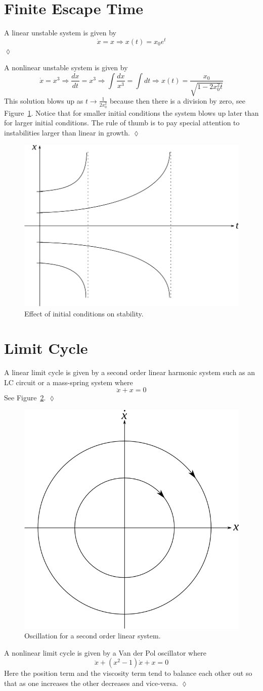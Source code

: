 \section{Finite Escape Time}
\label{sec:01fet}
\begin{example}
A linear unstable system is given by
$$\dot{x} = x \Rightarrow x(t) = x_0e^t$$
$\lozenge$
\end{example}

\begin{example}
A nonlinear unstable system is given by
$$\dot{x} = x^3 \Rightarrow \frac{dx}{dt}=x^3 \Rightarrow \int\frac{dx}{x^3} = \int dt \Rightarrow x(t) = \frac{x_0}{\sqrt{1-2x_0^2t}}$$
This solution blows up as $t\to\frac{1}{2x_0^2}$ because then there is a division by zero, see Figure~\ref{fig:01blowup}.
Notice that for smaller initial conditions the system blows up later than for larger initial conditions.
The rule of thumb is to pay special attention to instabilities larger than linear in growth.
$\lozenge$
\end{example}

\begin{figure}[ht!]
\centering
\includegraphics[width=.4\textwidth]{images/01blowup}
\caption{Effect of initial conditions on stability.}
\label{fig:01blowup}
\end{figure}

\section{Limit Cycle}
\begin{example}
A linear limit cycle is given by a second order linear harmonic system such as an LC circuit or a mass-spring system where
$$\ddot{x} + x = 0$$
See Figure~\ref{fig:01secondorder}.
$\lozenge$
\end{example}

\begin{figure}[ht!]
\centering
\includegraphics[width=.4\textwidth]{images/01secondorder}
\caption{Oscillation for a second order linear system.}
\label{fig:01secondorder}
\end{figure}

\begin{example}
A nonlinear limit cycle is given by a Van der Pol oscillator where
$$\ddot{x} + (x^2-1)\dot{x} + x = 0$$
Here the position term and the viscosity term tend to balance each other out so that as one increases the other decreases and vice-versa.
$\lozenge$
\end{example}
